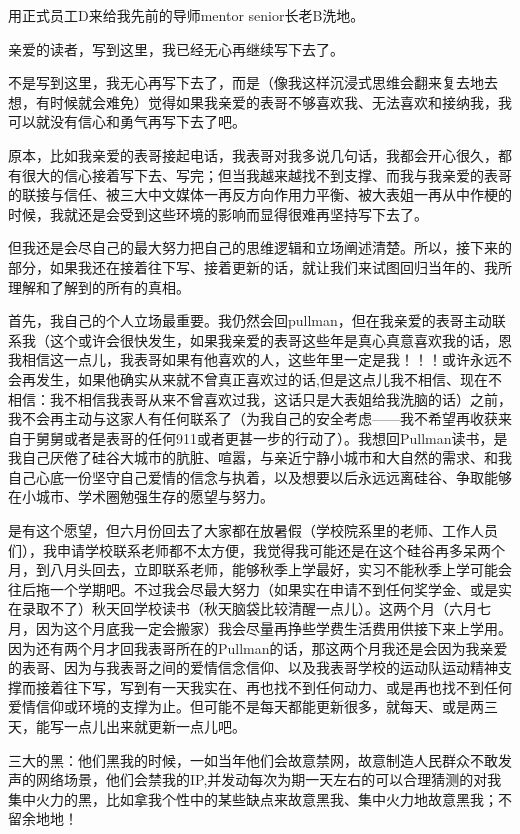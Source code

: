 \documentclass[9pt, b5paper]{article}
\begin{document}
用正式员工D来给我先前的导师mentor senior长老B洗地。 

亲爱的读者，写到这里，我已经无心再继续写下去了。

不是写到这里，我无心再写下去了，而是（像我这样沉浸式思维会翻来复去地去想，有时候就会难免）觉得如果我亲爱的表哥不够喜欢我、无法喜欢和接纳我，我可以就没有信心和勇气再写下去了吧。 

原本，比如我亲爱的表哥接起电话，我表哥对我多说几句话，我都会开心很久，都有很大的信心接着写下去、写完；但当我越来越找不到支撑、而我与我亲爱的表哥的联接与信任、被三大中文媒体一再反方向作用力平衡、被大表姐一再从中作梗的时候，我就还是会受到这些环境的影响而显得很难再坚持写下去了。 

但我还是会尽自己的最大努力把自己的思维逻辑和立场阐述清楚。所以，接下来的部分，如果我还在接着往下写、接着更新的话，就让我们来试图回归当年的、我所理解和了解到的所有的真相。

首先，我自己的个人立场最重要。我仍然会回pullman，但在我亲爱的表哥主动联系我（这个或许会很快发生，如果我亲爱的表哥这些年是真心真意喜欢我的话，恩我相信这一点儿，我表哥如果有他喜欢的人，这些年里一定是我！！！或许永远不会再发生，如果他确实从来就不曾真正喜欢过的话,但是这点儿我不相信、现在不相信：我不相信我表哥从来不曾喜欢过我，这话只是大表姐给我洗脑的话）之前，我不会再主动与这家人有任何联系了（为我自己的安全考虑——我不希望再收获来自于舅舅或者是表哥的任何911或者更甚一步的行动了）。我想回Pullman读书，是我自己厌倦了硅谷大城市的肮脏、喧嚣，与亲近宁静小城市和大自然的需求、和我自己心底一份坚守自己爱情的信念与执着，以及想要以后永远远离硅谷、争取能够在小城市、学术圈勉强生存的愿望与努力。

是有这个愿望，但六月份回去了大家都在放暑假（学校院系里的老师、工作人员们），我申请学校联系老师都不太方便，我觉得我可能还是在这个硅谷再多呆两个月，到八月头回去，立即联系老师，能够秋季上学最好，实习不能秋季上学可能会往后拖一个学期吧。不过我会尽最大努力（如果实在申请不到任何奖学金、或是实在录取不了）秋天回学校读书（秋天脑袋比较清醒一点儿）。这两个月（六月七月，因为这个月底我一定会搬家）我会尽量再挣些学费生活费用供接下来上学用。因为还有两个月才回我表哥所在的Pullman的话，那这两个月我还是会因为我亲爱的表哥、因为与我表哥之间的爱情信念信仰、以及我表哥学校的运动队运动精神支撑而接着往下写，写到有一天我实在、再也找不到任何动力、或是再也找不到任何爱情信仰或环境的支撑为止。但可能不是每天都能更新很多，就每天、或是两三天，能写一点儿出来就更新一点儿吧。

三大的黑：他们黑我的时候，一如当年他们会故意禁网，故意制造人民群众不敢发声的网络场景，他们会禁我的IP,并发动每次为期一天左右的可以合理猜测的对我集中火力的黑，比如拿我个性中的某些缺点来故意黑我、集中火力地故意黑我；不留余地地！
\end{document}
